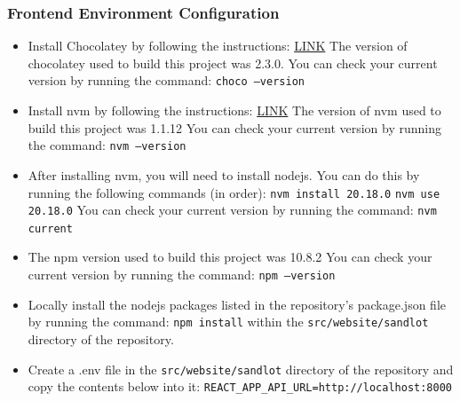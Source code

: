 \documentclass{article}
\begin{document}
        \subsubsection{Frontend Environment Configuration}
            \begin{itemize}
                \item Install Chocolatey by following the instructions:
                \href{https://docs.chocolatey.org/en-us/choco/setup/}{LINK}
                \newline The version of chocolatey used to build this project
                was 2.3.0. 
                \newline You can check your current version by running the command:
                \newline \texttt{choco --version} 
                \item Install nvm by following the instructions:
                \href{https://github.com/coreybutler/nvm-windows}{LINK}
                \newline The version of nvm used to build this project
                was 1.1.12
                \newline You can check your current version by running the command:
                \newline \texttt{nvm --version}
                \item After installing nvm, you will need to install nodejs.
                \newline You can do this by running the following commands (in order):
                \newline \texttt{nvm install 20.18.0}
                \newline \texttt{nvm use 20.18.0}
                \newline You can check your current version by running the command:
                \newline \texttt{nvm current}
                \item The npm version used to build this project was 10.8.2
                \newline You can check your current version by running the command:
                \newline \texttt{npm --version}
                \item Locally install the nodejs packages listed in the repository's 
                package.json file by running the command:
                \newline \texttt{npm install}
                \newline within the \texttt{src/website/sandlot} directory of the 
                repository.
                \item Create a .env file in the \texttt{src/website/sandlot} directory
                of the repository and copy the contents below into it:
                \newline \texttt{REACT\_APP\_API\_URL=http://localhost:8000}
            \end{itemize}
\end{document}
